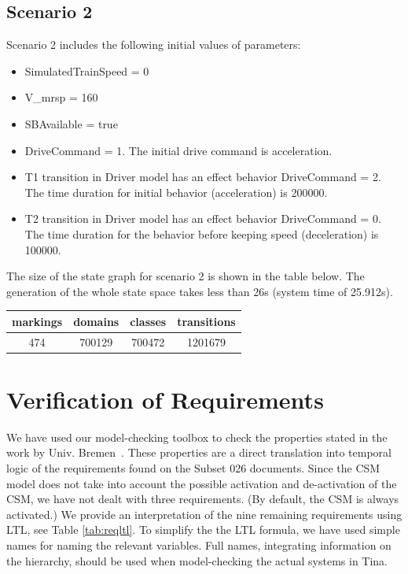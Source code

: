 \subsection{Scenario 2}
Scenario 2 includes the following initial values of parameters:
\begin{itemize}
\item
SimulatedTrainSpeed = 0
\item
V\_mrsp = 160
\item
SBAvailable = true
\item
DriveCommand = 1. The initial drive command is acceleration. 
\item
T1 transition in Driver model has an effect behavior DriveCommand = 2. The time duration for initial behavior (acceleration) is 200000. 
\item
T2 transition in Driver model has an effect behavior DriveCommand = 0. The time duration for the behavior before keeping speed (deceleration) is 100000. 
\end{itemize}

The size of the state graph for scenario 2 is shown in the table
below. The generation of the whole state space takes less than 26s
(system time of 25.912s).

\begin{center}
  \begin{tabular}{|c|c|c|c|}
    \hline
    markings & domains & classes & transitions \\
    \hline
    474 & 700129	 & 700472 & 1201679 \\ 
    \hline
  \end{tabular}
\end{center}

\section{Verification of Requirements}
\label{sec:verif}

We have used our model-checking toolbox to check the properties stated
in the work by Univ. Bremen~\cite{csmwp4}. These properties are a
direct translation into temporal logic of the requirements found on
the Subset 026 documents. Since the CSM model does not take into
account the possible activation and de-activation of the CSM, we have
not dealt with three requirements. (By default, the CSM is always
activated.) We provide an interpretation of the nine remaining
requirements using LTL, see Table \ref{tab:reqltl}. To simplify the
the LTL formula, we have used simple names for naming the relevant
variables. Full names, integrating information on the hierarchy,
should be used when model-checking the actual systems in Tina.


